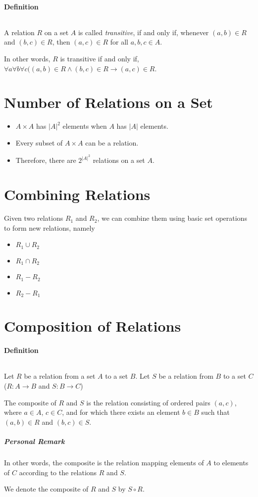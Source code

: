 \documentclass[10pt,a4paper]{book}
\begin{document}
\paragraph*{Definition}
$\ $\par
A relation $R$ on a set $A$ is called \textit{transitive}, if and only if, whenever $(a,b) \in R$ and $(b,c) \in R$, then $(a,c) \in R$ for all $a,b,c \in A$.\par
In other words, $R$ is transitive if and only if, $\forall a \forall b \forall c ((a,b) \in R \land (b,c) \in R \to (a,c) \in R$.

\section{Number of Relations on a Set}
\begin{itemize}
\item $A \times A$ has $|A|^2$ elements when $A$ has $|A|$ elements.
\item Every subset of $A \times A$ can be a relation.
\item Therefore, there are $2^{{|A|}^2}$ relations on a set $A$.
\end{itemize}

\section{Combining Relations}
Given two relations $R_1$ and $R_2$, we can combine them using basic set operations to form new relations, namely
\begin{itemize}
\item $R_1 \cup R_2$
\item $R_1 \cap R_2$
\item $R_1 - R_2$
\item $R_2 - R_1$
\end{itemize}

\section{Composition of Relations}
\paragraph*{Definition}
$\ $\par
Let $R$ be a relation from a set $A$ to a set $B$. Let $S$ be a relation from $B$ to a set $C$ ($R : A \to B$ and $S : B \to C$)\par
The composite of $R$ and $S$ is the relation consisting of ordered pairs $(a,c)$, where $a \in A$, $c \in C$, and for which there exists an element $b \in B$ such that $(a,b) \in R$ and $(b,c) \in S$.
\subparagraph*{Personal Remark}
In other words, the composite is the relation mapping elements of $A$ to elements of $C$ according to the relations $R$ and $S$.\par
$\ $\\
We denote the composite of $R$ and $S$ by $S \circ R$.
\end{document}
